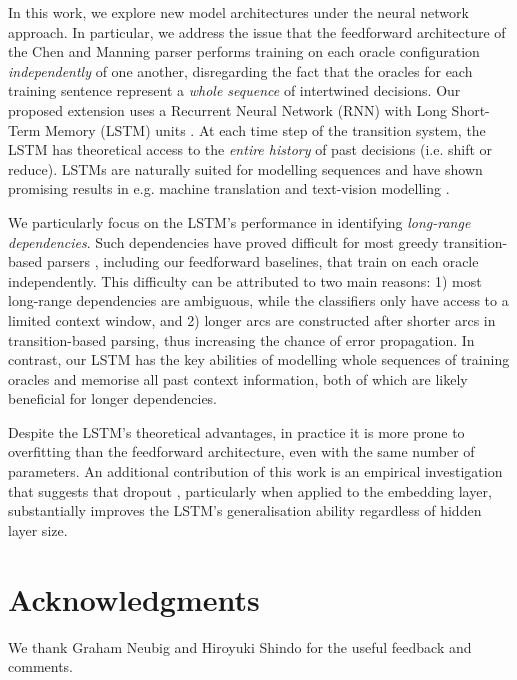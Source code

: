 \documentclass[11pt,a4paper]{article}
\begin{document}
In this work, we explore new model architectures under the neural network approach. In particular, we address the issue that the feedforward architecture of the Chen and Manning parser performs training on each oracle configuration \textit{independently} of one another, disregarding the fact that the oracles for each training sentence represent a \textit{whole sequence} of intertwined decisions. Our proposed extension uses a Recurrent Neural Network (RNN) with Long Short-Term Memory (LSTM) units \cite{HS97}. At each time step of the transition system, the LSTM has theoretical access to the \textit{entire history} of past decisions (i.e. shift or reduce). LSTMs are naturally suited for modelling sequences and have shown promising results in e.g. machine translation \cite{Set14} and text-vision modelling \cite{Vet141}.

\par We particularly focus on the LSTM's performance in identifying \textit{long-range dependencies}. Such dependencies have proved difficult for most greedy transition-based parsers \cite{MN07}, including our feedforward baselines, that train on each oracle independently. This difficulty can be attributed to two main reasons: 1) most long-range dependencies are ambiguous, while the classifiers only have access to a limited context window, and 2) longer arcs are constructed after shorter arcs in transition-based parsing, thus increasing the chance of error propagation. In contrast, our LSTM has the key abilities of modelling  whole sequences of training oracles and memorise all past context information, both of which are likely beneficial for longer dependencies.

\par Despite the LSTM's theoretical advantages, in practice it is more prone to overfitting than the feedforward architecture, even with the same number of parameters. An additional contribution of this work is an empirical investigation that suggests that dropout \cite{Set142}, particularly when applied to the embedding layer, substantially improves the LSTM's generalisation ability regardless of hidden layer size. %











\section*{Acknowledgments}

We thank Graham Neubig and Hiroyuki Shindo for the useful feedback and comments. 



\nocite{*}
\newpage


\end{document}
